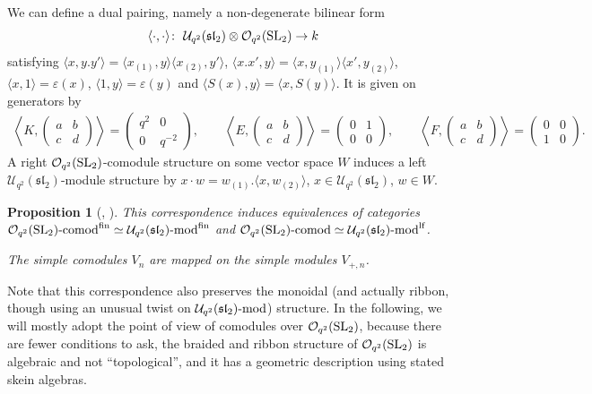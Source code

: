\documentclass[pdftex]{sigma}%
\numberwithin{equation}{section}
\newtheorem{Proposition}[Theorem]{Proposition}
 { \theoremstyle{definition}
\newtheorem{Definition}[Theorem]{Definition}
\newtheorem{Note}[Theorem]{Note}
\newtheorem{Example}[Theorem]{Example}
\newtheorem{Remark}[Theorem]{Remark} }
\newcommand{\Oq}{\mathcal{O}_{q^2}({\rm SL}_2)}
\newcommand{\Uq}{\mathcal{U}_{q^2}(\mathfrak{sl}_2)}
\newcommand{\Uqmod}{\Uq\text{-}{\rm mod}}
\begin{document}
\begin{Definition}
We can define a dual pairing, namely a non-degenerate bilinear form
\[
\langle \cdot,\cdot\rangle \colon \  \Uq \otimes \Oq \to k
\] satisfying $\langle x, y.y'\rangle = \langle x_{(1)},y\rangle \langle x_{(2)},y'\rangle$, $\langle x.x', y\rangle = \langle x,y_{(1)}\rangle \langle x',y_{(2)}\rangle$, $\langle x,1\rangle = \varepsilon(x)$, $\langle 1,y\rangle = \varepsilon(y)$ and $\langle S(x),y\rangle = \langle x,S(y)\rangle$. It is given on generators by
\begin{gather*}
 \left\langle K,\begin{pmatrix}a&b\\c&d \end{pmatrix} \right\rangle =
 \begin{pmatrix}q^2&0\\0&q^{-2} \end{pmatrix}\!, \qquad \!
 \left\langle E,
 \begin{pmatrix}a&b\\c&d \end{pmatrix} \right\rangle =
 \begin{pmatrix}0&1\\0&0 \end{pmatrix}\!,\qquad \!
 \left\langle F,\begin{pmatrix} a&b\\c&d \end{pmatrix}\right\rangle =
 \begin{pmatrix}0&0\\1&0 \end{pmatrix}\!.
 \end{gather*}
 A right $\Oq$-comodule structure on some vector space $W$ induces a left $\Uq$-module structure by $x\cdot w = w_{(1)}. \langle x,w_{(2)} \rangle$, $x \in \Uq$, $w\in W$.
\end{Definition}

\begin{Proposition}[{\cite[equation~(3.3), p.~126]{Abe}, \cite[Theorem~7.9]{Takeuchi}}]\label{propOqcomodUqmod}
This correspondence induces equivalences of categories $\Oq\text{-}{\rm comod}^{\rm fin}\simeq \Uq\text{-}{\rm mod}^{\rm fin}$ and $\Oq\text{-}{\rm comod} \simeq \Uq\text{-}{\rm mod}^{\rm lf}$.

The simple comodules $V_n$ are mapped on the simple modules $V_{+,n}$.
\end{Proposition}

Note that this correspondence also preserves the monoidal (and actually ribbon, though using an unusual twist on $\Uqmod$) structure. In the following, we will mostly adopt the point of view of comodules over $\Oq$, because there are fewer conditions to ask, the braided and ribbon structure of $\Oq$ is algebraic and not ``topological'', and it has a geometric description using stated skein algebras.
\end{document}
